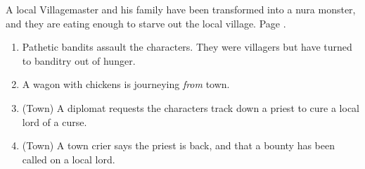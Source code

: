 \begin{multicols}{2}
A local Villagemaster and his family have been transformed into a nura monster, and they are eating enough to starve out the local village.
Page \pageref{desperatemeasures}.

\begin{enumerate}

	\item{ Pathetic bandits assault the characters.  They were villagers but have turned to banditry out of hunger.}
	\item{A wagon with chickens is journeying \emph{from} town.}
	\item{ (Town) A diplomat requests the characters track down a priest to cure a local lord of a curse.}
	\item{ (Town) A town crier says the priest is back, and that a bounty has been called on a local lord.}
\end{enumerate}


%
%
%
%
%

\setcounter{encnum}{1}

\end{multicols}

